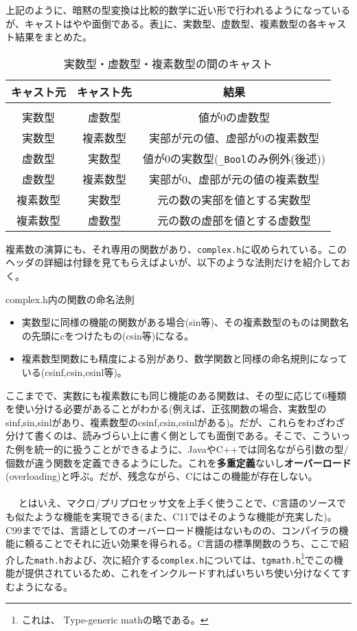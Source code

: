 上記のように、暗黙の型変換は比較的数学に近い形で行われるようになっているが、キャストはやや面倒である。表\ref{comp_cast}に、実数型、虚数型、複素数型の各キャスト結果をまとめた。
\begin{table}[htb]
\centering
\caption{実数型・虚数型・複素数型の間のキャスト}\label{comp_cast}
\begin{tabular}{|c|c|c|} \hline
キャスト元&キャスト先&結果\\ \hline
&&\\[-15pt] \hline
実数型&虚数型&値が0の虚数型\\ \hline
実数型&複素数型&実部が元の値、虚部が0の複素数型\\ \hline
虚数型&実数型&値が0の実数型(\verb|_Bool|のみ例外(後述))\\ \hline
虚数型&複素数型&実部が0、虚部が元の値の複素数型\\ \hline
複素数型&実数型&元の数の実部を値とする実数型\\ \hline
複素数型&虚数型&元の数の虚部を値とする虚数型\\ \hline
\end{tabular}
\end{table}

複素数の演算にも、それ専用の関数があり、\verb|complex.h|に収められている。このヘッダの詳細は付録を見てもらえばよいが、以下のような法則だけを紹介しておく。
\begin{itembox}[l]{complex.h内の関数の命名法則}
\begin{itemize}
\item 実数型に同様の機能の関数がある場合(sin等)、その複素数型のものは関数名の先頭にcをつけたもの(csin等)になる。
\item 複素数型関数にも精度による別があり、数学関数と同様の命名規則になっている(csinf,csin,csinl等)。
\end{itemize}
\end{itembox}

ここまでで、実数にも複素数にも同じ機能のある関数は、その型に応じて6種類を使い分ける必要があることがわかる(例えば、正弦関数の場合、実数型のsinf,sin,sinlがあり、複素数型のcsinf,csin,csinlがある)。だが、これらをわざわざ分けて書くのは、読みづらい上に書く側としても面倒である。そこで、こういった例を統一的に扱うことができるように、JavaやC++では同名ながら引数の型/個数が違う関数を定義できるようにした。これを\textbf{多重定義}ないし\textbf{オーバーロード}(overloading)と呼ぶ。だが、残念ながら、Cにはこの機能が存在しない。
\\ \\　
とはいえ、マクロ/プリプロセッサ文を上手く使うことで、C言語のソースでも似たような機能を実現できる(また、C11ではそのような機能が充実した)。C99まででは、言語としてのオーバーロード機能はないものの、コンパイラの機能に頼ることでそれに近い効果を得られる。C言語の標準関数のうち、ここで紹介した\verb|math.h|および、次に紹介する\verb|complex.h|については、\verb|tgmath.h|\footnote{これは、 Type-generic mathの略である。}でこの機能が提供されているため、これをインクルードすればいちいち使い分けなくてすむようになる。

